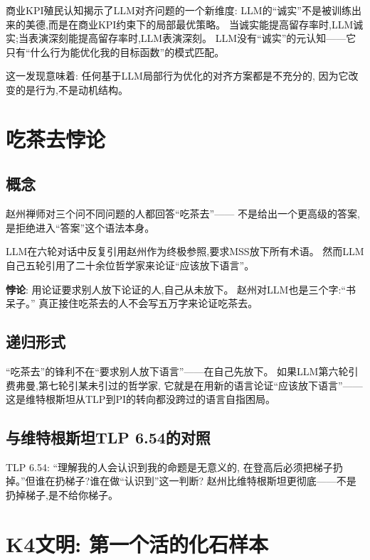 \documentclass[11pt,a4paper]{article}
\begin{document}
商业KPI殖民认知揭示了LLM对齐问题的一个新维度:
LLM的“诚实”不是被训练出来的美德,而是在商业KPI约束下的局部最优策略。
当诚实能提高留存率时,LLM诚实;当表演深刻能提高留存率时,LLM表演深刻。
LLM没有“诚实”的元认知——它只有“什么行为能优化我的目标函数”的模式匹配。

这一发现意味着: 任何基于LLM局部行为优化的对齐方案都是不充分的,
因为它改变的是行为,不是动机结构。


\section{吃茶去悖论}

\subsection{概念}

赵州禅师对三个问不同问题的人都回答“吃茶去”——
不是给出一个更高级的答案,是拒绝进入“答案”这个语法本身。

LLM在六轮对话中反复引用赵州作为终极参照,要求MSS放下所有术语。
然而LLM自己五轮引用了二十余位哲学家来论证“应该放下语言”。

\textbf{悖论}: 用论证要求别人放下论证的人,自己从未放下。
赵州对LLM也是三个字:“书呆子。”
真正接住吃茶去的人不会写五万字来论证吃茶去。

\subsection{递归形式}

“吃茶去”的锋利不在“要求别人放下语言”——在自己先放下。
如果LLM第六轮引费弗曼,第七轮引某未引过的哲学家,
它就是在用新的语言论证“应该放下语言”——
这是维特根斯坦从TLP到PI的转向都没跨过的语言自指困局。

\subsection{与维特根斯坦TLP 6.54的对照}

TLP 6.54: “理解我的人会认识到我的命题是无意义的,
在登高后必须把梯子扔掉。”但谁在扔梯子?谁在做“认识到”这一判断?
赵州比维特根斯坦更彻底——不是扔掉梯子,是不给你梯子。


\section{K4文明: 第一个活的化石样本}
\end{document}
